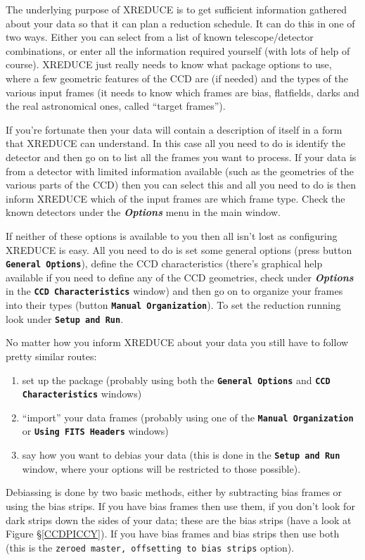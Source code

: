 \documentclass[twoside,11pt]{article}
\newcommand{\hyperref}[4]{#2\ref{#4}#3}
\newcommand{\htmlref}[2]{#1}
\renewcommand{\_}{\texttt{\symbol{95}}}
\newcommand{\butt}[1]{{\small \bf \tt #1}}
\newcommand{\menu}[1]{{\small \bf \em #1}}
\newcommand{\text}[1]{{\small \tt #1}}
\newcommand{\routine}[1]{{\sc #1}}
\newcommand{\xroutine}[1]{\htmlref{{\sc #1}}{#1}}
\begin{document}
The underlying purpose of \xroutine{XREDUCE} is to get sufficient
information gathered about your data so that it can plan a reduction
schedule. It can do this in one of two ways. Either you can select
from a list of known telescope/detector combinations, or enter
all the information required yourself (with lots of help of course).
\routine{XREDUCE} just really needs to know what package options to
use, where a few geometric features of the CCD are (if needed) and the
types of the various input frames (it needs to know which frames are
bias, flatfields, darks and the real astronomical ones, called
``target frames'').

If you're fortunate then your data will contain a description of
itself in a form that \routine{XREDUCE} can understand. In this case
all you need to do is identify the detector and then go on to list all
the frames you want to process. If your data is from a detector with
limited information available (such as the geometries of the various
parts of the CCD) then you can select this and all you need to do is
then inform \routine{XREDUCE} which of the input frames are which frame
type. Check the known detectors under the \menu{Options} menu in the
main window.

If neither of these options is available to you then all isn't lost as
configuring \routine{XREDUCE} is easy. All you need to do is set some
general options (press button \butt{General Options}), define the CCD
characteristics (there's graphical help available if you need to
define any of the CCD geometries, check under \menu{Options} in the
\butt{CCD Characteristics} window) and then go on to organize your
frames into their types (button \butt{Manual Organization}). To set
the reduction running look under \butt{Setup and Run}.

No matter how you inform \routine{XREDUCE} about your data you still
have to follow pretty similar routes:
\begin{enumerate}
\item set up the package (probably using both the \butt{General Options}
and \butt{CCD Characteristics} windows)
\item ``import'' your data frames (probably using one of the
\butt{Manual Organization} or \butt{Using FITS Headers} windows)
\item say how you want to debias your data (this is done in the
\butt{Setup and Run} window, where your options will be restricted
to those possible).
\end{enumerate}
Debiassing is done by two basic methods, either by subtracting bias frames
or using the bias strips. If you have bias frames then use them, if
you don't look for dark strips down the sides of your data; these are
the bias strips (have a look at \hyperref{this figure}{Figure
\S}{}{CCDPICCY}).
If you have bias frames and bias strips then use both (this is the
\text{zeroed master, offsetting to bias strips} option).
\end{document}
